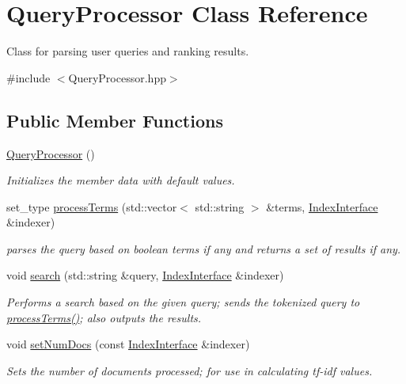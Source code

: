 \hypertarget{class_query_processor}{}\section{Query\+Processor Class Reference}
\label{class_query_processor}


Class for parsing user queries and ranking results.  




{\ttfamily \#include $<$Query\+Processor.\+hpp$>$}

\subsection*{Public Member Functions}
\begin{DoxyCompactItemize}
\item 
\hyperlink{class_query_processor_a32a6760ff0aab51b38fb8eb236e2e140}{Query\+Processor} ()
\begin{DoxyCompactList}\small\item\em Initializes the member data with default values. \end{DoxyCompactList}\item 
set\+\_\+type \hyperlink{class_query_processor_a24544d09490d3ef704acaae4f3d5d478}{process\+Terms} (std\+::vector$<$ std\+::string $>$ \&terms, \hyperlink{class_index_interface}{Index\+Interface} \&indexer)
\begin{DoxyCompactList}\small\item\em parses the query based on boolean terms if any and returns a set of results if any. \end{DoxyCompactList}\item 
void \hyperlink{class_query_processor_a08d7a42132998959c37e75ec61d5662c}{search} (std\+::string \&query, \hyperlink{class_index_interface}{Index\+Interface} \&indexer)
\begin{DoxyCompactList}\small\item\em Performs a search based on the given query; sends the tokenized query to \hyperlink{class_query_processor_a24544d09490d3ef704acaae4f3d5d478}{process\+Terms()}; also outputs the results. \end{DoxyCompactList}\item 
void \hyperlink{class_query_processor_a9bf3ee98ae9154d55ea70051ea199673}{set\+Num\+Docs} (const \hyperlink{class_index_interface}{Index\+Interface} \&indexer)
\begin{DoxyCompactList}\small\item\em Sets the number of documents processed; for use in calculating tf-\/idf values. \end{DoxyCompactList}\end{DoxyCompactItemize}


